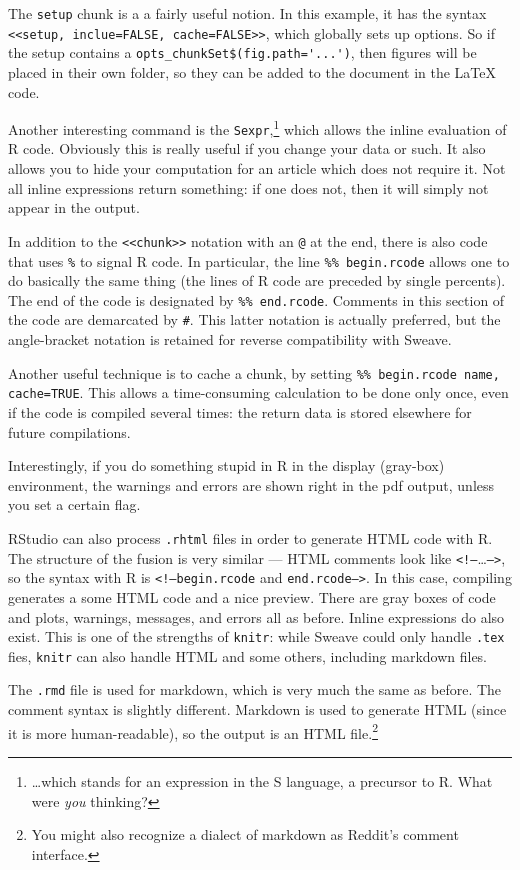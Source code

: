 The \texttt{setup} chunk is a a fairly useful notion. In this example, it has the syntax \texttt{<<setup, inclue=FALSE, cache=FALSE>>}, which globally sets up options. So if the setup contains a \verb+opts_chunkSet$(fig.path='...')+, then figures will be placed in their own folder, so they can be added to the document in the \LaTeX{} code.

Another interesting command is the \texttt{Sexpr},\footnote{\dots which stands for an expression in the S language, a precursor to R. What were \emph{you} thinking?} which allows the inline evaluation of R code. Obviously this is really useful if you change your data or such. It also allows you to hide your computation for an article which does not require it. Not all inline expressions return something: if one does not, then it will simply not appear in the output.

In addition to the \texttt{<<chunk>>} notation with an \texttt{@} at the end, there is also code that uses \texttt{\%} to signal R code. In particular, the line \texttt{\%\% begin.rcode} allows one to do basically the same thing (the lines of R code are preceded by single percents). The end of the code is designated by \texttt{\%\% end.rcode}. Comments in this section of the code are demarcated by \texttt{\#}. This latter notation is actually preferred, but the angle-bracket notation is retained for reverse compatibility with Sweave.

Another useful technique is to cache a chunk, by setting \texttt{\%\% begin.rcode name, cache=TRUE}. This allows a time-consuming calculation to be done only once, even if the code is compiled several times: the return data is stored elsewhere for future compilations.

Interestingly, if you do something stupid in R in the display (gray-box) environment, the warnings and errors are shown right in the pdf output, unless you set a certain flag.

RStudio can also process \texttt{.rhtml} files in order to generate HTML code with R. The structure of the fusion is very similar --- HTML comments look like \texttt{<!--}\dots\texttt{-->}, so the syntax with R is \texttt{<!--begin.rcode} and \texttt{end.rcode-->}. In this case, compiling generates a some HTML code and a nice preview. There are gray boxes of code and plots, warnings, messages, and errors all as before. Inline expressions do also exist. This is one of the strengths of \texttt{knitr}: while Sweave could only handle \texttt{.tex} fies, \texttt{knitr} can also handle HTML and some others, including markdown files.

The \texttt{.rmd} file is used for markdown, which is very much the same as before. The comment syntax is slightly different. Markdown is used to generate HTML (since it is more human-readable), so the output is an HTML file.\footnote{You might also recognize a dialect of markdown as Reddit's comment interface.}
%
